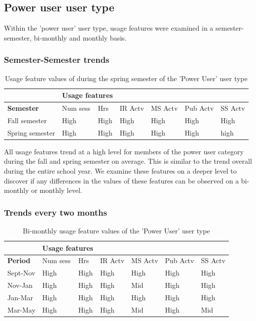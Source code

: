 \documentclass{acm_proc_article-sp}
\begin{document}
\subsection {Power user user type}
Within the 'power user' user type, usage features were examined in a semester-semester, bi-monthly and monthly basis.

\subsubsection{Semester-Semester trends}

\begin{table}
\caption{Usage feature values of during the spring semester of the 'Power User' user type}
\label{cluster1month}
\begin{tabular}{|p{1.5cm}|p{0.6cm}|p{0.6cm}|p{0.6cm}|p{0.6cm}|p{0.8cm}|p{0.8cm}|}
& \multicolumn{2}{r}{\textbf{Usage features}}  \\ \hline
 \textbf{Semester} 
 & Num sess & Hrs & IR Actv & MS Actv & Pub Actv & SS Actv \\ \hline
Fall  semester & High & High  & High & High & High & High \\ \hline
Spring semester & High & High  & High & High & High & high \\ \hline
\end{tabular}
\end{table}

All usage features trend at a high level for members of the power user category during the fall and spring semester on average. This is similar to the trend overall during the entire school year. We examine these features on a deeper level to discover if any differences in the values of these features can be observed on a bi-monthly or monthly level.

\subsubsection{Trends every two months}
\begin{table}
\caption{Bi-monthly usage feature values of the 'Power User' user type}
\label{cluster1bimonthly}
\begin{tabular}{|p{1.5cm}|p{0.6cm}|p{0.6cm}|p{0.6cm}|p{0.6cm}|p{0.8cm}|p{0.8cm}|}
& \multicolumn{2}{r}{\textbf{Usage features}}  \\ \hline
 \textbf{Period} 
 & Num sess & Hrs & IR Actv & MS Actv & Pub Actv & SS Actv \\ \hline
Sept-Nov & High & High  & High & High & High & High \\ \hline
Nov-Jan & High & High  & High & Mid & High & High \\ \hline
Jan-Mar & High & High  & High & High & High & High \\ \hline
Mar-May & High & High  & High & Mid & High & Mid \\ \hline
\end{tabular}
\end{table}
\end{document}
